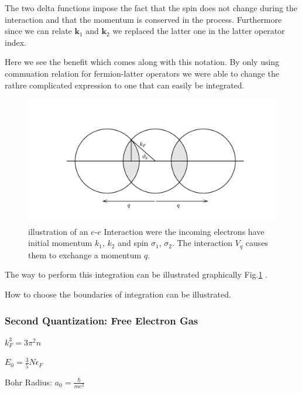 \documentclass[10pt]{report}
\numberwithin{equation}{chapter}
\newcommand{\myRef}[1]{
  Fig.\ref{#1}
}
\begin{document}
The two delta functions impose the fact that the spin does not change during the interaction and that the momentum is conserved in the process. Furthermore since we can relate $\mathbf{k}_1$ and $\mathbf{k}_2$ we replaced the latter one in the latter operator index.

Here we see the benefit which comes along with this notation. By only using commuation relation for fermion-latter operators we were able to change the rathre complicated expression to one that can easily be integrated.


\begin{figure}
  \centering
  \includegraphics[width=1.0\textwidth]{../img/sq_graph_integration.pdf}
  \caption{illustration of an $e$-$e$ Interaction were the incoming electrons have initial momentum $k_1$, $k_2$ and spin $\sigma_1$, $\sigma_2$. The interaction $V_q$ causes them to exchange a momentum $q$.}
  \label{fig:sq_graph_integration}
\end{figure}

The way to perform this integration can be illustrated graphically \myRef{fig:sq_graph_integration}. 

How to choose the boundaries of integration can be illustrated. 










\subsubsection*{Second Quantization: Free Electron Gas} %

$ k_F^3 = 3 \pi^2 n$

$ E_0 = \frac{3}{5} N \epsilon_F$

Bohr Radius: $a_0 = \frac{\hbar}{m e^2}$
\end{document}
